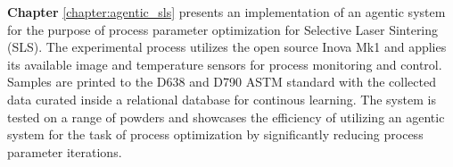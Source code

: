 \textbf{Chapter} \ref{chapter:agentic_sls} presents an implementation of an
agentic system for the purpose of process parameter optimization for Selective
Laser Sintering (SLS). The experimental process utilizes the open source Inova
Mk1 and applies its available image and temperature sensors for process
monitoring and control. Samples are printed to the D638
\cite{d20_committee_test_2014} and D790 \cite{d20_committee_test_2015} ASTM
standard with the collected data curated inside a relational database for
continous learning. The system is tested on a range of powders and showcases the
efficiency of utilizing an agentic system for the task of process optimization
by significantly reducing process parameter iterations.